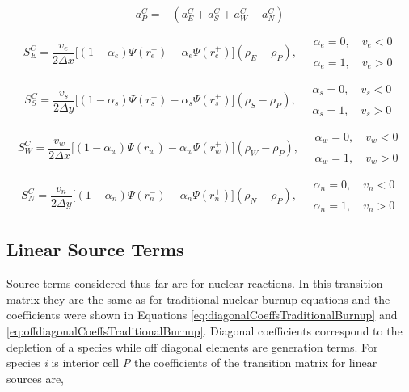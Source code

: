 \begin{equation*}
    a_{P}^{C} = -(a_{E}^{C} + a_{S}^{C} + a_{W}^{C} + a_{N}^{C})
\end{equation*}

\begin{equation*}
    S^{C}_{E} = \frac{v_{e}}{2\Delta x}\bigg[(1-\alpha_{e})\Psi(r_{e}^{-}) - \alpha_{e}\Psi(r_{e}^{+})\bigg](\rho_{E} - \rho_{P}), \quad \substack{\alpha_{e} = 0, \quad v_{e} < 0\\
    \\
    \alpha_{e} = 1, \quad v_{e} > 0}
\end{equation*}

\begin{equation*}
    S^{C}_{S} = \frac{v_{s}}{2\Delta y}\bigg[(1-\alpha_{s})\Psi(r_{s}^{-}) - \alpha_{s}\Psi(r_{s}^{+})\bigg](\rho_{S} - \rho_{P}), \quad \substack{\alpha_{s} = 0, \quad v_{s} < 0\\
    \\
    \alpha_{s} = 1, \quad v_{s} > 0}
\end{equation*}

\begin{equation*}
    S^{C}_{W} = \frac{v_{w}}{2\Delta x}\bigg[(1-\alpha_{w})\Psi(r_{w}^{-}) - \alpha_{w}\Psi(r_{w}^{+})\bigg](\rho_{W} - \rho_{P}), \quad \substack{\alpha_{w} = 0, \quad v_{w} < 0\\
    \\
    \alpha_{w} = 1, \quad v_{w} > 0}
\end{equation*}

\begin{equation*}
    S^{C}_{N} = \frac{v_{n}}{2\Delta y}\bigg[(1-\alpha_{n})\Psi(r_{n}^{-}) - \alpha_{n}\Psi(r_{n}^{+})\bigg](\rho_{N} - \rho_{P}), \quad \substack{\alpha_{n} = 0, \quad v_{n} < 0\\
    \\
    \alpha_{n} = 1, \quad v_{n} > 0}
\end{equation*}



\subsection{Linear Source Terms}
Source terms considered thus far are for nuclear reactions. In this transition matrix they are the same as for traditional nuclear burnup equations and the coefficients were shown in Equations \ref{eq:diagonalCoeffsTraditionalBurnup} and \ref{eq:offdiagonalCoeffsTraditionalBurnup}. Diagonal coefficients correspond to the depletion of a species while off diagonal elements are generation terms. For species \textit{i} is interior cell \textit{P} the coefficients of the transition matrix for linear sources are,

